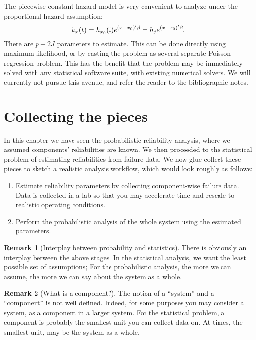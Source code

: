 \documentclass[12pt,a4paper]{report}
\theoremstyle{plain}
\theoremstyle{definition}
\newtheorem{remark}{Remark}
\begin{document}
The piecewise-constant hazard model is very convenient to analyze under the proportional hazard assumption:
\begin{align}
	h_{x} (t) = h_{x_0} (t) e^{(x-x_0)'\beta} = h_j e^{(x-x_0)'\beta}.
\end{align}
There are $p+2J$ parameters to estimate.
This can be done directly using maximum likelihood, or by casting the problem as several separate Poisson regression problem. 
This has the benefit that the problem may be immediately solved with any statistical software suite, with existing numerical solvers.
We will currently not pursue this avenue, and refer the reader to the bibliographic notes.



\section{Collecting the pieces}
In this chapter we have seen the probabilistic reliability analysis, where we assumed components' reliabilities are known. 
We then proceeded to the statistical problem of estimating reliabilities from failure data.
We now glue collect these pieces to sketch a realistic analysis workflow, which would look roughly as follows:
\begin{enumerate}
\item Estimate reliability parameters by collecting component-wise failure data. Data is collected in a lab so that you may accelerate time and rescale to realistic operating conditions.
\item Perform the probabilistic analysis of the whole system using the estimated parameters.
\end{enumerate}


\begin{remark}[Interplay between probability and statistics]
There is obviously an interplay between the above stages:
In the statistical analysis, we want the least possible set of assumptions;
For the probabilistic analysis, the more we can assume, the more we can say about the system as a whole.
\end{remark}



\begin{remark}[What is a component?]
The notion of a ``system'' and a ``component'' is not well defined.
Indeed, for some purposes you may consider a system, as a component in a larger system.
For the statistical problem, a component is probably the smallest unit you can collect data on. At times, the smallest unit, may be the system as a whole.
\end{remark}
\end{document}
